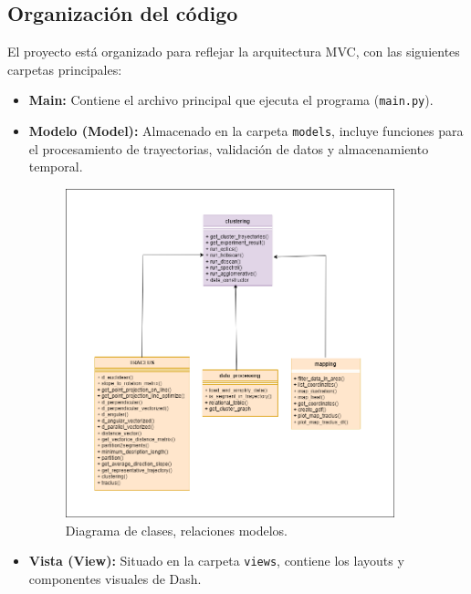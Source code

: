 \subsection{Organización del código}

El proyecto está organizado para reflejar la arquitectura MVC, con las siguientes carpetas principales:

\begin{itemize}
    \item \textbf{Main:} Contiene el archivo principal que ejecuta el programa (\texttt{main.py}).
    \item \textbf{Modelo (Model):} Almacenado en la carpeta \texttt{models}, incluye funciones para el procesamiento de trayectorias, validación de datos y almacenamiento temporal.
    
\begin{figure}[H]
    \centering
    \includegraphics[width=0.9\textwidth]{img/Models.png}
    \caption{Diagrama de clases, relaciones modelos.}
\end{figure}
    
    
    \item \textbf{Vista (View):} Situado en la carpeta \texttt{views}, contiene los layouts y componentes visuales de Dash.
    

\end{itemize}

